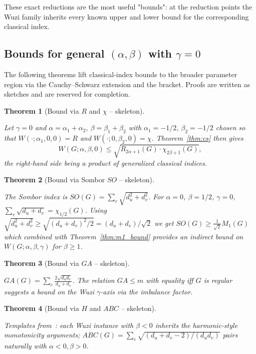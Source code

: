 \documentclass[11pt,a4paper]{article}
\newtheorem{theorem}{Theorem}[section]
\theoremstyle{definition}
\newcommand{\Wuzi}{W(G;\alpha,\beta,\gamma)}
\newcommand{\todo}[1]{}
\begin{document}
These exact reductions are the most useful "bounds": at the
reduction points the Wuzi family inherits every known upper and
lower bound for the corresponding classical index.

\subsection{Bounds for general $(\alpha,\beta)$ with $\gamma=0$}

The following theorems lift classical-index bounds to the broader
parameter region via the Cauchy--Schwarz extension and the bracket.
Proofs are written as sketches and are reserved for completion.

\begin{theorem}[Bound via $R$ and $\chi$ -- skeleton]\label{thm:R_chi}
\todo{PROOF SKETCH -- TO BE COMPLETED}
Let $\gamma=0$ and $\alpha=\alpha_1+\alpha_2$, $\beta=\beta_1+\beta_2$
with $\alpha_1=-1/2$, $\beta_2=-1/2$ chosen so that $W(\cdot;\alpha_1,0,0)=R$
and $W(\cdot;0,\beta_2,0)=\chi$. Theorem~\ref{thm:cs} then gives
\[W(G;\alpha,\beta,0)\le \sqrt{R_{2\alpha+1}(G)\cdot \chi_{2\beta+1}(G)},\]
the right-hand side being a product of generalized classical
indices.
\end{theorem}

\begin{theorem}[Bound via Sombor $SO$ -- skeleton]\label{thm:sombor}
\todo{PROOF SKETCH -- TO BE COMPLETED}
The Sombor index is $SO(G)=\sum_e \sqrt{d_u^2+d_v^2}$.
For $\alpha=0$, $\beta=1/2$, $\gamma=0$,
$\sum_e\sqrt{d_u+d_v}=\chi_{1/2}(G)$. Using
$\sqrt{d_u^2+d_v^2}\ge\sqrt{(d_u+d_v)^2/2}=(d_u+d_v)/\sqrt 2$
we get $SO(G)\ge\frac{1}{\sqrt 2}M_1(G)$ which combined with
Theorem~\ref{thm:m1_bound} provides an indirect bound on $\Wuzi$
for $\beta\ge 1$.
\end{theorem}

\begin{theorem}[Bound via $GA$ -- skeleton]\label{thm:GA}
\todo{PROOF SKETCH -- TO BE COMPLETED}
$GA(G)=\sum_e \frac{2\sqrt{d_u d_v}}{d_u+d_v}$. The relation
$GA\le m$ with equality iff $G$ is regular suggests a bound on the
Wuzi $\gamma$-axis via the imbalance factor.
\end{theorem}

\begin{theorem}[Bound via $H$ and $ABC$ -- skeleton]\label{thm:H_ABC}
\todo{PROOF SKETCH -- TO BE COMPLETED}
Templates from~\cite{Movahedi2025arXivDSO}: each Wuzi instance with
$\beta<0$ inherits the harmonic-style monotonicity arguments;
$ABC(G)=\sum_e\sqrt{(d_u+d_v-2)/(d_u d_v)}$ pairs naturally with
$\alpha<0,\beta>0$.
\end{theorem}
\end{document}

